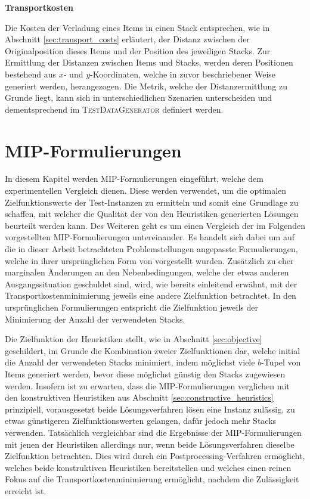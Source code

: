 \textbf{Transportkosten}

Die Kosten der Verladung eines Items in einen Stack entsprechen, wie in Abschnitt \ref{sec:transport_costs}
erläutert, der Distanz zwischen der Originalposition dieses Items und der Position des jeweiligen Stacks.
Zur Ermittlung der Distanzen zwischen Items und Stacks, werden deren Positionen bestehend aus
$x$- und $y$-Koordinaten, welche in zuvor beschriebener Weise generiert werden, herangezogen.
Die Metrik, welche der Distanzermittlung zu Grunde liegt, kann sich in unterschiedlichen Szenarien
unterscheiden und dementsprechend im \textsc{TestDataGenerator} definiert werden.

\vfill

\pagebreak

\section{MIP-Formulierungen}
\label{sec:mip_formulations}

In diesem Kapitel werden MIP-Formulierungen eingeführt, welche dem experimentellen Vergleich dienen.
Diese werden verwendet, um die optimalen Zielfunktionswerte der Test-Instanzen zu ermitteln und somit eine Grundlage zu schaffen, mit welcher die Qualität der von den Heuristiken generierten Lösungen beurteilt werden kann. Des Weiteren geht es um einen Vergleich der im Folgenden vorgestellten MIP-Formulierungen untereinander.
Es handelt sich dabei um auf die in dieser Arbeit betrachteten Problemstellungen angepasste Formulierungen,
welche in ihrer ursprünglichen Form von \citet{Le2016} vorgestellt wurden.
Zusätzlich zu eher marginalen Änderungen an den Nebenbedingungen, welche der etwas anderen Ausgangssituation geschuldet sind,
wird, wie bereits einleitend erwähnt, mit der Transportkostenminimierung jeweils eine andere Zielfunktion betrachtet.
In den ursprünglichen Formulierungen entspricht die Zielfunktion jeweils der Minimierung der Anzahl der verwendeten Stacks.

Die Zielfunktion der Heuristiken stellt, wie in Abschnitt \ref{sec:objective} geschildert, im Grunde die Kombination
zweier Zielfunktionen dar, welche initial die Anzahl der verwendeten Stacks minimiert, indem möglichst viele
$b$-Tupel von Items generiert werden, bevor diese möglichst günstig den Stacks zugewiesen werden.
Insofern ist zu erwarten, dass die MIP-Formulierungen verglichen mit den konstruktiven Heuristiken
aus Abschnitt \ref{sec:constructive_heuristics} prinzipiell, vorausgesetzt beide Lösungsverfahren lösen eine
Instanz zulässig, zu etwas günstigeren Zielfunktionswerten gelangen, dafür jedoch mehr Stacks verwenden.
Tatsächlich vergleichbar sind die Ergebnisse der MIP-Formulierungen mit jenen der Heuristiken allerdings nur,
wenn beide Lösungsverfahren dieselbe Zielfunktion betrachten. Dies wird durch ein Postprocessing-Verfahren
ermöglicht, welches beide konstruktiven Heuristiken bereitstellen und welches einen reinen Fokus auf die
Transportkostenminimierung ermöglicht, nachdem die Zulässigkeit erreicht ist.

